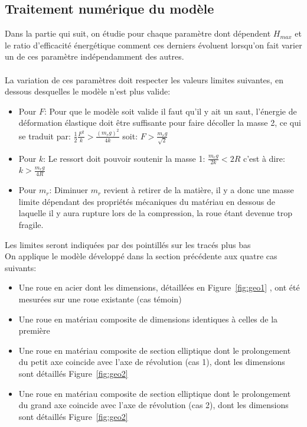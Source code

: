 \subsection{Traitement numérique du modèle}
Dans la partie qui suit, on étudie pour chaque paramètre dont dépendent $H_{max}$ et le ratio d'efficacité énergétique comment ces derniers évoluent lorsqu'on fait varier un de ces paramètre indépendamment des autres.
\\ 
\\ 
La variation de ces paramètres doit respecter les valeurs limites suivantes, en dessous desquelles le modèle n'est plus valide:
\begin{itemize}
    \item Pour $F$: Pour que le modèle soit valide il faut qu’il y ait un saut, l'énergie de déformation élastique doit être suffisante pour faire décoller la masse 2, ce qui se traduit par: $\frac{1}{2} \frac{F^2}{k}>\frac{(m_r g)^2}{4k}$  soit: $F>\frac{m_r g}{\sqrt{2}}$
    \item Pour $k$: Le ressort doit pouvoir soutenir la masse 1: $\frac{m_r g}{2k}<2R$ c'est à dire: $k>\frac{m_r g}{4R}$ 
    \item Pour $m_r$: Diminuer $m_r$ revient à retirer de la matière, il y a donc une masse limite dépendant des propriétés mécaniques du matériau en dessous de laquelle il y aura rupture lors de la compression, la roue étant devenue trop fragile.
\end{itemize}
Les limites seront indiquées par des pointillés sur les tracés plus bas
\\
On applique le modèle développé dans la section précédente aux quatre cas suivants:
\begin{itemize}
	\item Une roue en acier dont les dimensions, détaillées en Figure~\ref{fig:geo1} ,  ont été mesurées sur une roue existante (cas témoin)
	\item Une roue en matériau composite de dimensions identiques à celles de la première
	\item Une roue en matériau composite de section elliptique dont le prolongement du petit axe coincide avec l'axe de révolution (cas 1), dont les dimensions sont détaillés Figure~\ref{fig:geo2}
	\item Une roue en matériau composite de section elliptique dont le prolongement du grand axe coincide avec l'axe de révolution (cas 2), dont les dimensions sont détaillés Figure~\ref{fig:geo2}
\end{itemize}

